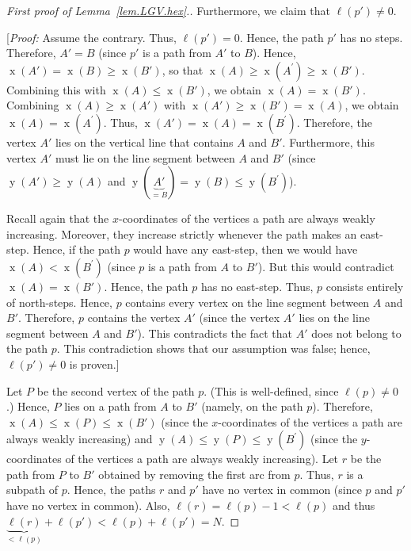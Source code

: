 \documentclass[reqno]{amsart}
\newcommand{\0}{\phantom{c}}
\DeclareMathOperator{\xcoord}{x} %
\DeclareMathOperator{\ycoord}{y} %
\newenvironment{verlong}{}{}
\theoremstyle{plain}
\theoremstyle{definition}
\numberwithin{equation}{section}
\begin{document}
\begin{verlong}
\begin{proof}[First proof of Lemma~\ref{lem.LGV.hex}.]
Furthermore, we claim that $\ell\left(  p'\right)  \neq0$.

[\textit{Proof:} Assume the contrary. Thus, $\ell\left(  p'\right)
=0$. Hence, the path $p'$ has no steps. Therefore, $A'=B$
(since $p'$ is a path from $A'$ to $B$). Hence,
$\xcoord\left(  A'\right)  =\xcoord\left(
B\right)  \geq\xcoord\left(  B'\right)  $, so that
$\xcoord\left(  A\right)  \geq\xcoord\left(  A^{\prime
}\right)  \geq\xcoord\left(  B'\right)  $. Combining this
with $\xcoord\left(  A\right)  \leq\xcoord\left(
B'\right)  $, we obtain $\xcoord\left(  A\right)
=\xcoord\left(  B'\right)  $. Combining $\xcoord%
\left(  A\right)  \geq\xcoord\left(  A'\right)  $ with
$\xcoord\left(  A'\right)  \geq\xcoord\left(
B'\right)  =\xcoord\left(  A\right)  $, we obtain
$\xcoord\left(  A\right)  =\xcoord\left(  A^{\prime
}\right)  $. Thus, $\xcoord\left(  A'\right)
=\xcoord\left(  A\right)  =\xcoord\left(  B^{\prime
}\right)  $. Therefore, the vertex $A'$ lies on the vertical line that
contains $A$ and $B'$. Furthermore, this vertex $A'$ must lie
on the line segment between $A$ and $B'$ (since $\ycoord%
\left(  A'\right)  \geq\ycoord\left(  A\right)  $ and
$\ycoord\left(  \underbrace{A'}_{=B}\right)
=\ycoord\left(  B\right)  \leq\ycoord\left(  B^{\prime
}\right)  $).

Recall again that the $x$-coordinates of the vertices a path are always weakly
increasing. Moreover, they increase strictly whenever the path makes an
east-step. Hence, if the path $p$ would have any east-step, then we would have
$\xcoord\left(  A\right)  <\xcoord\left(  B^{\prime
}\right)  $ (since $p$ is a path from $A$ to $B'$). But this would
contradict $\xcoord\left(  A\right)  =\xcoord\left(
B'\right)  $. Hence, the path $p$ has no east-step. Thus, $p$ consists
entirely of north-steps. Hence, $p$ contains every vertex on the line segment
between $A$ and $B'$. Therefore, $p$ contains the vertex $A'$
(since the vertex $A'$ lies on the line segment between $A$ and
$B'$). This contradicts the fact that $A'$ does not belong to
the path $p$. This contradiction shows that our assumption was false; hence,
$\ell\left(  p'\right)  \neq0$ is proven.]

Let $P$ be the second vertex of the path $p$. (This is well-defined, since
$\ell\left(  p\right)  \neq0$.) Hence, $P$ lies on a path from $A$ to
$B'$ (namely, on the path $p$). Therefore, $\xcoord\left(
A\right)  \leq\xcoord\left(  P\right)  \leq\xcoord\left(
B'\right)  $ (since the $x$-coordinates of the vertices a path are
always weakly increasing) and $\ycoord\left(  A\right)
\leq\ycoord\left(  P\right)  \leq\ycoord\left(  B^{\prime
}\right)  $ (since the $y$-coordinates of the vertices a path are always weakly
increasing). Let $r$ be the path from $P$ to $B'$ obtained by removing
the first arc from $p$. Thus, $r$ is a subpath of $p$. Hence, the paths $r$
and $p'$ have no vertex in common (since $p$ and $p'$ have no
vertex in common). Also, $\ell\left(  r\right)  =\ell\left(  p\right)
-1<\ell\left(  p\right)  $ and thus $\underbrace{\ell\left(  r\right)
}_{<\ell\left(  p\right)  }+\ell\left(  p'\right)  <\ell\left(
p\right)  +\ell\left(  p'\right)  =N$.


\end{proof}
\end{verlong}
\end{document}
